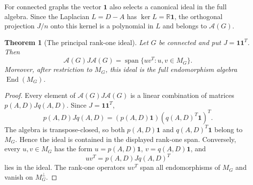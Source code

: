 \documentclass[a4paper,fleqn]{cas-sc}
\newtheorem{theorem}{Theorem}[section]
\theoremstyle{definition}
\theoremstyle{remark}
\newtheorem{remark}[theorem]{Remark}
\newcommand{\R}{\mathbb R}
\newcommand{\one}{\mathbf 1}
\newcommand{\Aalg}{\mathcal A}
\newcommand{\End}{\operatorname{End}}
\newcommand{\tr}{\operatorname{tr}}
\newcommand{\Span}{\operatorname{span}}
\begin{document}
For connected graphs the vector $\one$ also selects a canonical ideal in the full
algebra.  Since the Laplacian $L=D-A$ has $\ker L=\R\one$, the orthogonal
projection $J/n$ onto this kernel is a polynomial in $L$ and belongs to
$\Aalg(G)$.

\begin{theorem}[The principal rank-one ideal]
\label{thm:principal-ideal}
Let $G$ be connected and put $J=\one\one^T$.  Then
\[
        \Aalg(G)J\Aalg(G)=\Span\{uv^T:u,v\in M_G\}.
\]
Moreover, after restriction to $M_G$, this ideal is the full endomorphism algebra
$\End(M_G)$.
\end{theorem}

\begin{proof}
Every element of $\Aalg(G)J\Aalg(G)$ is a linear combination of matrices
$p(A,D)Jq(A,D)$.  Since $J=\one\one^T$,
\[
        p(A,D)Jq(A,D)=(p(A,D)\one)(q(A,D)^T\one)^T .
\]
The algebra is transpose-closed, so both $p(A,D)\one$ and $q(A,D)^T\one$ belong
to $M_G$.  Hence the ideal is contained in the displayed rank-one span.
Conversely, every $u,v\in M_G$ has the form $u=p(A,D)\one$, $v=q(A,D)\one$, and
\[
        uv^T=p(A,D)Jq(A,D)^T
\]
lies in the ideal.  The rank-one operators $uv^T$ span all endomorphisms of
$M_G$ and vanish on $M_G^\perp$.
\end{proof}

\end{document}
